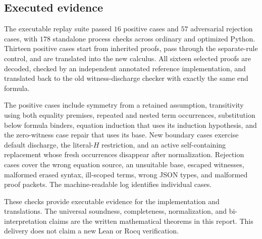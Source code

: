\subsection{Executed evidence}

The executable replay suite passed $16$ positive cases and $57$ adversarial
rejection cases, with $178$ standalone process checks across ordinary
and optimized Python. Thirteen positive cases start from inherited
proofs, pass through the separate-rule control, and are translated into
the new calculus. All sixteen selected proofs are decoded, checked by an
independent annotated reference implementation, and translated back to
the old witness-discharge checker with exactly the same end formula.

The positive cases include symmetry from a retained assumption,
transitivity using both equality premises, repeated and nested term
occurrences, substitution below formula binders, equation induction that
uses its induction hypothesis, and the zero-witness case repair that
uses its base. New boundary cases exercise default discharge, the
literal-$H$ restriction, and an active self-containing replacement whose
fresh occurrences disappear after normalization. Rejection cases cover
the wrong equation source, an unsuitable base, escaped witnesses,
malformed erased syntax, ill-scoped terms, wrong JSON types, and malformed
proof packets. The machine-readable log identifies individual cases.

These checks provide executable evidence for the implementation and
translations. The universal soundness, completeness, normalization, and
bi-interpretation claims are the written mathematical theorems in this
report. This delivery does not claim a new Lean or Rocq verification.
